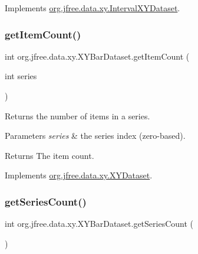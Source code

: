 Implements \mbox{\hyperlink{interfaceorg_1_1jfree_1_1data_1_1xy_1_1_interval_x_y_dataset_a0538ada774aad34ec95edbb84c1a82e1}{org.\+jfree.\+data.\+xy.\+Interval\+X\+Y\+Dataset}}.

\mbox{\label{classorg_1_1jfree_1_1data_1_1xy_1_1_x_y_bar_dataset_a2dc0cb6c553d2957352f666e1ef69c8c}} 
\subsubsection{\texorpdfstring{get\+Item\+Count()}{getItemCount()}}
{\footnotesize\ttfamily int org.\+jfree.\+data.\+xy.\+X\+Y\+Bar\+Dataset.\+get\+Item\+Count (\begin{DoxyParamCaption}\item[{int}]{series }\end{DoxyParamCaption})}

Returns the number of items in a series.


\begin{DoxyParams}{Parameters}
{\em series} & the series index (zero-\/based).\\
\hline
\end{DoxyParams}
\begin{DoxyReturn}{Returns}
The item count. 
\end{DoxyReturn}


Implements \mbox{\hyperlink{interfaceorg_1_1jfree_1_1data_1_1xy_1_1_x_y_dataset_ae81f9de91dfcae45028fc8a486a119da}{org.\+jfree.\+data.\+xy.\+X\+Y\+Dataset}}.

\mbox{\label{classorg_1_1jfree_1_1data_1_1xy_1_1_x_y_bar_dataset_a36b782d7a1148715662e4f9443b5f73b}} 
\subsubsection{\texorpdfstring{get\+Series\+Count()}{getSeriesCount()}}
{\footnotesize\ttfamily int org.\+jfree.\+data.\+xy.\+X\+Y\+Bar\+Dataset.\+get\+Series\+Count (\begin{DoxyParamCaption}{ }\end{DoxyParamCaption})}

